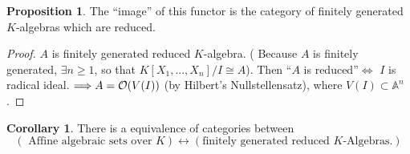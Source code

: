 \documentclass[11pt]{article}
\theoremstyle{definition}
\newtheorem{prop}[thm]{Proposition}
\newtheorem{cor}[thm]{Corollary}
\newcommand{\affn}{\mathbb A}
\newcommand{\calo}{{\cal O}}
\newcommand{\Lrta}{\Longrightarrow}
\newcommand{\llrta}{\longleftrightarrow}
\newcommand{\Llrta}{\Longleftrightarrow}
\begin{document}
\begin{prop} The ``image'' of this functor is the category of finitely generated $K$-algebras which are reduced.
\end{prop}
\begin{proof}
$A$ is  finitely generated reduced $K$-algebra. ( Because $A$ is finitely generated, $\exists n\geq 1$, so that $K[X_1,...,X_n]/I\cong A$). Then ``$A$ is reduced''$\Llrta$ $I$ is radical ideal.
$\Lrta A=\calo(V(I))$ (by Hilbert's Nullstellensatz), where $V(I)\subset \affn^n$.
\end{proof}

\begin{cor}
There is a equivalence of categories between 
$$
(\text{ Affine algebraic sets over $K$})\llrta (\text{finitely generated reduced } K\text{-Algebras}.)
$$
\end{cor}
\end{document}
